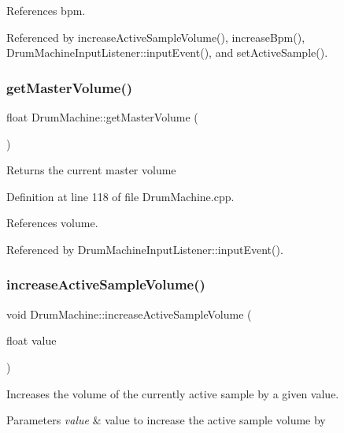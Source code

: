 References bpm.



Referenced by increase\+Active\+Sample\+Volume(), increase\+Bpm(), Drum\+Machine\+Input\+Listener\+::input\+Event(), and set\+Active\+Sample().

\mbox{\label{class_drum_machine_a3590f99d021aad35cca24fdcb0f8a246}} 
\subsubsection{\texorpdfstring{get\+Master\+Volume()}{getMasterVolume()}}
{\footnotesize\ttfamily float Drum\+Machine\+::get\+Master\+Volume (\begin{DoxyParamCaption}{ }\end{DoxyParamCaption})}

\begin{DoxyReturn}{Returns}
the current master volume 
\end{DoxyReturn}


Definition at line 118 of file Drum\+Machine.\+cpp.



References volume.



Referenced by Drum\+Machine\+Input\+Listener\+::input\+Event().

\mbox{\label{class_drum_machine_a2316557d08fecdaa8936be2562749e95}} 
\subsubsection{\texorpdfstring{increase\+Active\+Sample\+Volume()}{increaseActiveSampleVolume()}}
{\footnotesize\ttfamily void Drum\+Machine\+::increase\+Active\+Sample\+Volume (\begin{DoxyParamCaption}\item[{float}]{value }\end{DoxyParamCaption})}

Increases the volume of the currently active sample by a given value. 
\begin{DoxyParams}{Parameters}
{\em value} & value to increase the active sample volume by \\
\hline
\end{DoxyParams}


